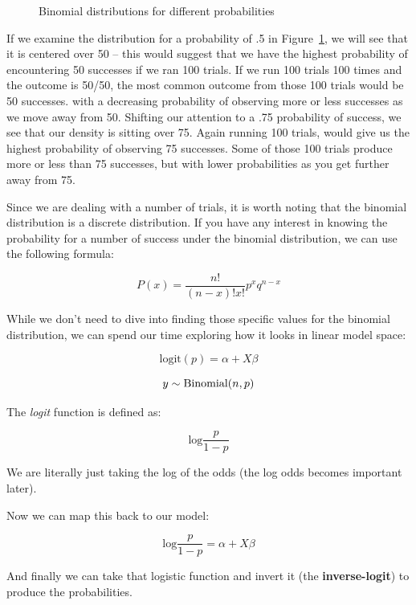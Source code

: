 \documentclass[
  letterpaper,
]{krantz}
\begin{document}
\begin{figure}[H]


\caption{\label{fig-binomial}Binomial distributions for different
probabilities}

\end{figure}%

If we examine the distribution for a probability of .5 in
Figure~\ref{fig-binomial}, we will see that it is centered over 50 --
this would suggest that we have the highest probability of encountering
50 successes if we ran 100 trials. If we run 100 trials 100 times and
the outcome is 50/50, the most common outcome from those 100 trials
would be 50 successes. with a decreasing probability of observing more
or less successes as we move away from 50. Shifting our attention to a
.75 probability of success, we see that our density is sitting over 75.
Again running 100 trials, would give us the highest probability of
observing 75 successes. Some of those 100 trials produce more or less
than 75 successes, but with lower probabilities as you get further away
from 75.

Since we are dealing with a number of trials, it is worth noting that
the binomial distribution is a discrete distribution. If you have any
interest in knowing the probability for a number of success under the
binomial distribution, we can use the following formula:

\[P(x) = \frac{n!}{(n-x)!x!}p^xq^{n-x}\]

While we don't need to dive into finding those specific values for the
binomial distribution, we can spend our time exploring how it looks in
linear model space:

\[
\textrm{logit}(p) = \alpha + X\beta
\]

\[y \sim \textrm{Binomial}(n, p) \\ \]

The \emph{logit} function is defined as:

\[\textrm{log}\frac{p}{1-p}\]

We are literally just taking the log of the odds (the log odds becomes
important later).

Now we can map this back to our model:

\[\textrm{log}\frac{p}{1-p} = \alpha + X\beta\]

And finally we can take that logistic function and invert it (the
\textbf{inverse-logit}) to produce the probabilities.
\end{document}
